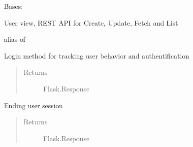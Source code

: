 \documentclass[letterpaper,10pt,english]{sphinxmanual}
\begin{document}

\begin{fulllineitems}
\label{app:app.views.UserView}
Bases: 

User view, REST API for Create, Update, Fetch and List

\begin{fulllineitems}
\label{app:app.views.UserView.methods}
\end{fulllineitems}


\begin{fulllineitems}
\label{app:app.views.UserView.resource}
alias of 

\end{fulllineitems}


\end{fulllineitems}


\begin{fulllineitems}
\label{app:app.views.login}
Login method for tracking user behavior and authentification
\begin{quote}\begin{description}
\item[{Returns}] \leavevmode
Flask.Response

\end{description}\end{quote}

\end{fulllineitems}


\begin{fulllineitems}
\label{app:app.views.logout}
Ending user session
\begin{quote}\begin{description}
\item[{Returns}] \leavevmode
Flask.Response

\end{description}\end{quote}

\end{fulllineitems}
\end{document}
